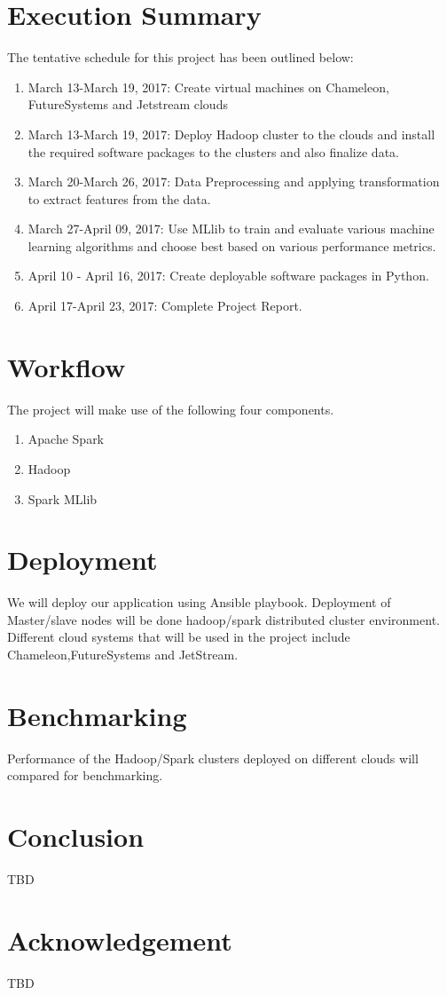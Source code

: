 \documentclass[9pt,twocolumn,twoside]{../../styles/osajnl}
\begin{document}
\section{Execution Summary}
The tentative schedule for  this project has been outlined below:
\begin{enumerate}
	\item {March 13-March 19, 2017:} Create virtual machines on Chameleon, FutureSystems
	and Jetstream clouds
	\item {March 13-March 19, 2017:} Deploy Hadoop cluster to the clouds and install the
	required software packages to the clusters and also finalize data.
	\item {March 20-March 26, 2017:} Data Preprocessing and applying transformation to
	extract features from the data.
	\item {March 27-April 09, 2017:} Use MLlib to train and evaluate various machine
	learning algorithms and choose best based on various performance metrics.
	\item {April 10 - April 16, 2017:} Create deployable software packages in Python.
	\item {April 17-April 23, 2017:} Complete Project Report.
\end{enumerate}

\section{Workflow}
The project will make use of the following four components. 
\begin{enumerate}
    \item Apache Spark
    \item Hadoop
    \item Spark MLlib

\end{enumerate}

\section{Deployment}
	We will deploy our application using Ansible\cite{www-ansible} playbook. Deployment
	of Master/slave nodes will be done hadoop/spark distributed cluster environment.
	Different cloud systems that will be used in the project include
	Chameleon,FutureSystems and JetStream.

\section{Benchmarking}
	Performance of the Hadoop/Spark clusters deployed on different clouds will
	compared for benchmarking.

\section{Conclusion}

TBD

\section{Acknowledgement}
TBD


\end{document}
